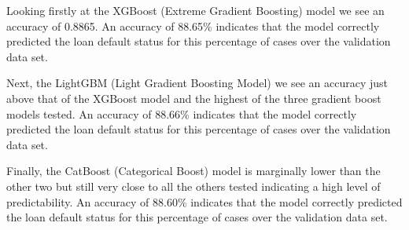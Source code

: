 \documentclass[12pt]{article}
\begin{document}
Looking firstly at the XGBoost (Extreme Gradient Boosting) model we see an accuracy of 0.8865. An accuracy of 88.65\% indicates that the model correctly predicted the loan default status for this percentage of cases over the validation data set.

Next, the LightGBM (Light Gradient Boosting Model) we see an accuracy just above that of the XGBoost model and the highest of the three gradient boost models tested. An accuracy of 88.66\% indicates that the model correctly predicted the loan default status for this percentage of cases over the validation data set.

Finally, the CatBoost (Categorical Boost) model is marginally lower than the other two but still very close to all the others tested indicating a high level of predictability. An accuracy of 88.60\% indicates that the model correctly predicted the loan default status for this percentage of cases over the validation data set.
\end{document}
